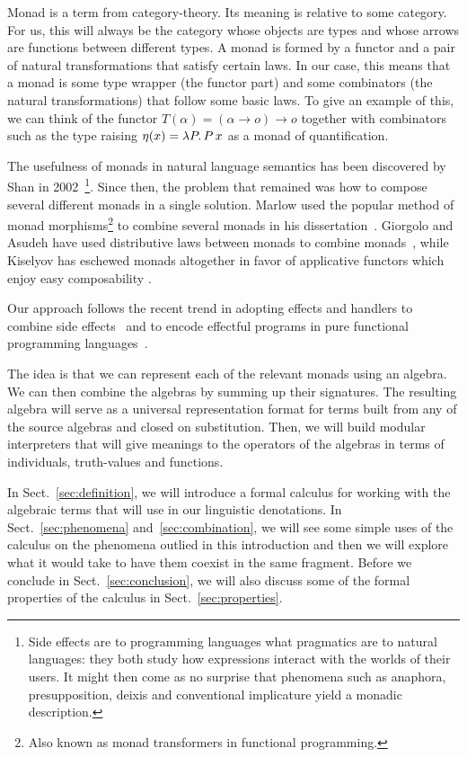 \documentclass{llncs}
\begin{document}
Monad is a term from category-theory. Its meaning is relative to some
category. For us, this will always be the category whose objects are types
and whose arrows are functions between different types. A monad is formed
by a functor and a pair of natural transformations that satisfy certain
laws. In our case, this means that a monad is some type wrapper (the
functor part) and some combinators (the natural transformations) that
follow some basic laws. To give an example of this, we can think of the
functor $T(\alpha) = (\alpha \to o) \to o$ together with combinators such
as the type raising $\eta(x) = \lambda P.\, P\,x$ as a monad of
quantification.

The usefulness of monads in natural language semantics has been discovered
by Shan in 2002~\cite{shan2002monads}\footnote{Side effects are to
  programming languages what pragmatics are to natural languages: they both
  study how expressions interact with the worlds of their users. It might
  then come as no surprise that phenomena such as anaphora, presupposition,
  deixis and conventional implicature yield a monadic description.}. Since
then, the problem that remained was how to compose several different monads
in a single solution. Marlow used the popular method of monad
morphisms\footnote{Also known as monad transformers in functional
  programming.} to combine several monads in his
dissertation~\cite{charlow2014semantics}. Giorgolo and Asudeh have used
distributive laws between monads to combine
monads~\cite{giorgolo2015natural}, while Kiselyov has eschewed monads
altogether in favor of applicative functors which enjoy easy composability
\cite{kiselyov2015applicative}.

Our approach follows the recent trend in adopting effects and handlers to
combine side effects~\cite{bauer2012programming,kammar2013handlers} and to
encode effectful programs in pure functional programming
languages~\cite{kiselyov2013extensible,brady2013programming}.

The idea is that we can represent each of the relevant monads using an
algebra. We can then combine the algebras by summing up their
signatures. The resulting algebra will serve as a universal representation
format for terms built from any of the source algebras and closed on
substitution. Then, we will build modular interpreters that will give
meanings to the operators of the algebras in terms of individuals,
truth-values and functions.

In Sect.~\ref{sec:definition}, we will introduce a formal calculus for
working with the algebraic terms that will use in our linguistic
denotations. In Sect.~\ref{sec:phenomena} and~\ref{sec:combination}, we
will see some simple uses of the calculus on the phenomena outlied in this
introduction and then we will explore what it would take to have them
coexist in the same fragment. Before we conclude in
Sect.~\ref{sec:conclusion}, we will also discuss some of the formal
properties of the calculus in Sect.~\ref{sec:properties}.
\end{document}
